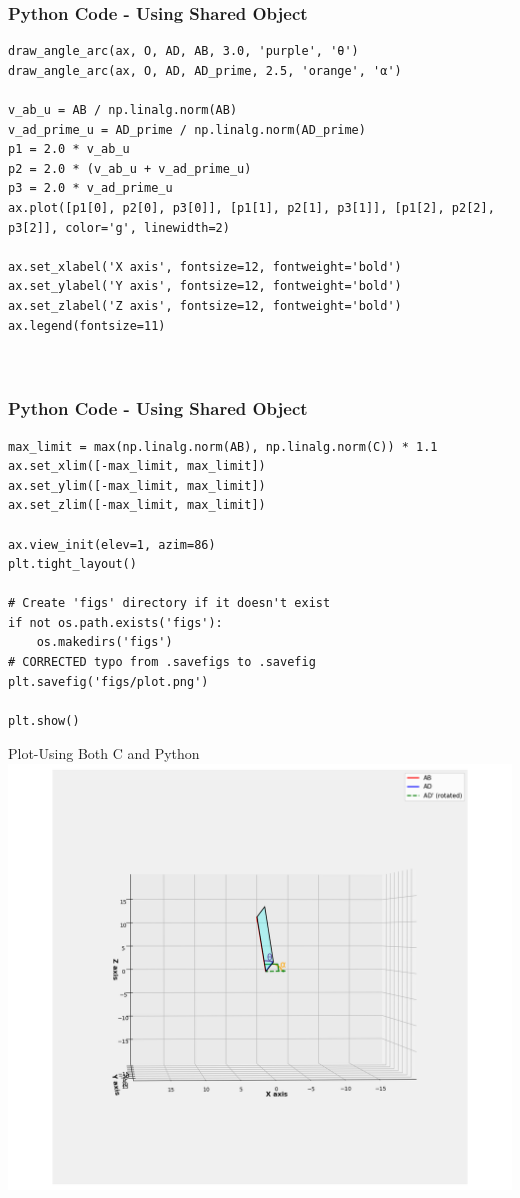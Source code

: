 \documentclass{beamer}
\begin{document}
\begin{frame}[fragile]
     \frametitle{Python Code - Using Shared Object}
     \begin{lstlisting}
draw_angle_arc(ax, O, AD, AB, 3.0, 'purple', 'θ')
draw_angle_arc(ax, O, AD, AD_prime, 2.5, 'orange', 'α')

v_ab_u = AB / np.linalg.norm(AB)
v_ad_prime_u = AD_prime / np.linalg.norm(AD_prime)
p1 = 2.0 * v_ab_u
p2 = 2.0 * (v_ab_u + v_ad_prime_u)
p3 = 2.0 * v_ad_prime_u
ax.plot([p1[0], p2[0], p3[0]], [p1[1], p2[1], p3[1]], [p1[2], p2[2], p3[2]], color='g', linewidth=2)

ax.set_xlabel('X axis', fontsize=12, fontweight='bold')
ax.set_ylabel('Y axis', fontsize=12, fontweight='bold')
ax.set_zlabel('Z axis', fontsize=12, fontweight='bold')
ax.legend(fontsize=11)



     \end{lstlisting}
     \end{frame}

     \begin{frame}[fragile]
     \frametitle{Python Code - Using Shared Object}
     \begin{lstlisting}
max_limit = max(np.linalg.norm(AB), np.linalg.norm(C)) * 1.1
ax.set_xlim([-max_limit, max_limit])
ax.set_ylim([-max_limit, max_limit])
ax.set_zlim([-max_limit, max_limit])

ax.view_init(elev=1, azim=86)
plt.tight_layout()

# Create 'figs' directory if it doesn't exist
if not os.path.exists('figs'):
    os.makedirs('figs')
# CORRECTED typo from .savefigs to .savefig
plt.savefig('figs/plot.png')

plt.show()

     \end{lstlisting}
     \end{frame}


\begin{frame}{Plot-Using Both C and Python}
    \centering
    \includegraphics[width=\columnwidth, height=0.8\textheight, keepaspectratio]{figs/plot.png}     
\end{frame}
\end{document}
